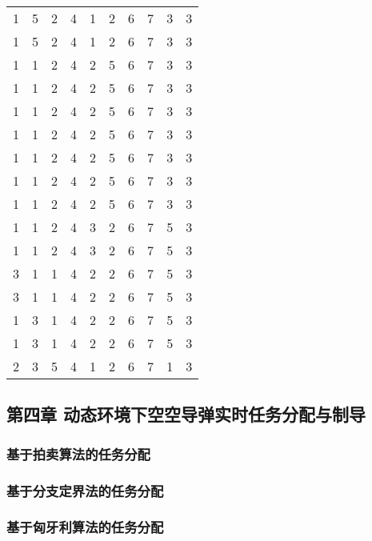 \begin{longtable}[]{@{}llllllllll@{}}
1 & 5 & 2 & 4 & 1 & 2 & 6 & 7 & 3 & 3\tabularnewline
1 & 5 & 2 & 4 & 1 & 2 & 6 & 7 & 3 & 3\tabularnewline
1 & 1 & 2 & 4 & 2 & 5 & 6 & 7 & 3 & 3\tabularnewline
1 & 1 & 2 & 4 & 2 & 5 & 6 & 7 & 3 & 3\tabularnewline
1 & 1 & 2 & 4 & 2 & 5 & 6 & 7 & 3 & 3\tabularnewline
1 & 1 & 2 & 4 & 2 & 5 & 6 & 7 & 3 & 3\tabularnewline
1 & 1 & 2 & 4 & 2 & 5 & 6 & 7 & 3 & 3\tabularnewline
1 & 1 & 2 & 4 & 2 & 5 & 6 & 7 & 3 & 3\tabularnewline
1 & 1 & 2 & 4 & 2 & 5 & 6 & 7 & 3 & 3\tabularnewline
1 & 1 & 2 & 4 & 3 & 2 & 6 & 7 & 5 & 3\tabularnewline
1 & 1 & 2 & 4 & 3 & 2 & 6 & 7 & 5 & 3\tabularnewline
3 & 1 & 1 & 4 & 2 & 2 & 6 & 7 & 5 & 3\tabularnewline
3 & 1 & 1 & 4 & 2 & 2 & 6 & 7 & 5 & 3\tabularnewline
1 & 3 & 1 & 4 & 2 & 2 & 6 & 7 & 5 & 3\tabularnewline
1 & 3 & 1 & 4 & 2 & 2 & 6 & 7 & 5 & 3\tabularnewline
2 & 3 & 5 & 4 & 1 & 2 & 6 & 7 & 1 & 3\tabularnewline
\bottomrule
\end{longtable}

\hypertarget{ux7b2cux56dbux7ae0-ux52a8ux6001ux73afux5883ux4e0bux7a7aux7a7aux5bfcux5f39ux5b9eux65f6ux4efbux52a1ux5206ux914dux4e0eux5236ux5bfc}{%
\subsection{第四章
动态环境下空空导弹实时任务分配与制导}\label{ux7b2cux56dbux7ae0-ux52a8ux6001ux73afux5883ux4e0bux7a7aux7a7aux5bfcux5f39ux5b9eux65f6ux4efbux52a1ux5206ux914dux4e0eux5236ux5bfc}}

\hypertarget{ux57faux4e8eux62cdux5356ux7b97ux6cd5ux7684ux4efbux52a1ux5206ux914d}{%
\subsubsection{基于拍卖算法的任务分配}\label{ux57faux4e8eux62cdux5356ux7b97ux6cd5ux7684ux4efbux52a1ux5206ux914d}}

\hypertarget{ux57faux4e8eux5206ux652fux5b9aux754cux6cd5ux7684ux4efbux52a1ux5206ux914d}{%
\subsubsection{基于分支定界法的任务分配}\label{ux57faux4e8eux5206ux652fux5b9aux754cux6cd5ux7684ux4efbux52a1ux5206ux914d}}

\hypertarget{ux57faux4e8eux5308ux7259ux5229ux7b97ux6cd5ux7684ux4efbux52a1ux5206ux914d}{%
\subsubsection{基于匈牙利算法的任务分配}\label{ux57faux4e8eux5308ux7259ux5229ux7b97ux6cd5ux7684ux4efbux52a1ux5206ux914d}}

